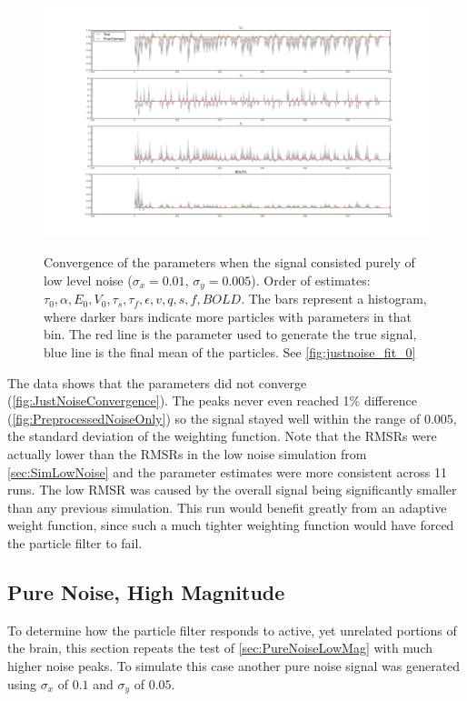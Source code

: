 \begin{figure}[H]
\centering
\subfigure
{\includegraphics[clip=true,trim=7cm 3cm 6cm 3cm, width=\textwidth]{images/justnoise_hist_3}}
\caption[Convergence of the parameters during a noise-only run.]
{Convergence of the parameters when the signal consisted purely of low level noise 
($\sigma_x = 0.01$, $\sigma_y = 0.005$).
Order of estimates: $\tau_0, \alpha, E_0, V_0, \tau_s, \tau_f, \epsilon, v,
q, s, f, BOLD$.  The bars represent
a histogram, where darker bars indicate more particles with parameters in that bin. The red 
line is the parameter used to generate the true signal, blue line is the final mean of the
particles. See \autoref{fig:justnoise_fit_0}}
\label{fig:JustNoiseConvergence}
\end{figure}

The data shows that the parameters did not converge
(\autoref{fig:JustNoiseConvergence}).
The peaks never even reached 1\% difference
(\autoref{fig:PreprocessedNoiseOnly}) so  the signal  stayed
well within the range of $0.005$, the standard deviation of the weighting function.
Note that the \acp{RMSR}
were actually lower than the \acp{RMSR} in the low noise simulation 
from \autoref{sec:SimLowNoise}
and the parameter estimates were more consistent across 11 runs.
The low \ac{RMSR} was caused by the overall
signal being significantly smaller than any previous simulation.
This run would benefit greatly from an adaptive weight function, since
such a much tighter weighting function would have forced the particle
filter to fail.

\subsection{Pure Noise, High Magnitude}
\label{sec:PureNoiseHighMag}
To determine how the particle filter responds to active, yet unrelated
portions of the brain, this section repeats the test of \autoref{sec:PureNoiseLowMag}
with much higher noise peaks. To simulate this case another
pure noise signal was generated using $\sigma_x$ of $0.1$ and $\sigma_y$ of $0.05$.

